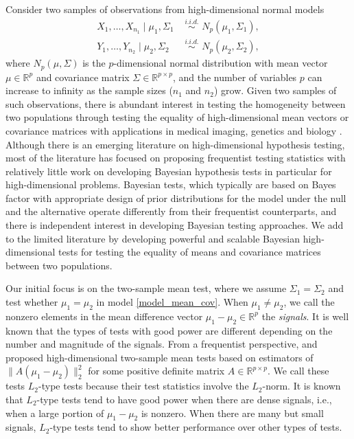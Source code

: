 \documentclass[11pt]{article}
\newcommand{\sg}{\Sigma}
\newcommand{\bbR}{\mathbb{R}}
\begin{document}
Consider two samples of observations from high-dimensional normal models 
\begin{equation}
	\begin{split}\label{model_mean_cov}
		X_1,\ldots, X_{n_1} \mid \mu_1, \sg_1 &\,\,\overset{i.i.d.}{\sim}\,\, N_p(\mu_1, \sg_1) , \\
		Y_1,\ldots, Y_{n_2} \mid \mu_2, \sg_2 &\,\,\overset{i.i.d.}{\sim}\,\, N_p(\mu_2,  \sg_2), 
	\end{split}
\end{equation}
where $N_p(\mu,\sg)$ is the $p$-dimensional normal distribution with mean vector $\mu\in\bbR^p$ and covariance matrix $\sg \in \bbR^{p\times p}$, and the number of variables $p$ can increase to infinity as the sample sizes ($n_1$ and $n_2$) grow.  Given two samples of such observations, there is abundant interest in testing the homogeneity between two populations through testing  the equality of high-dimensional mean vectors or covariance matrices with applications in medical imaging, genetics and biology \citep{tsai2009multivariate,shen2011shrinkage}. Although there is an emerging literature on high-dimensional hypothesis testing, most of the literature has focused on proposing frequentist testing statistics with relatively little work on developing Bayesian hypothesis tests in particular for high-dimensional problems.  Bayesian tests, which typically are based on Bayes factor with appropriate design of prior distributions for the model under the null and the alternative operate differently from their frequentist counterparts, and there is independent interest in developing Bayesian testing approaches.   We add to the limited literature by developing powerful and scalable Bayesian high-dimensional tests for testing the equality of means and covariance matrices between two populations. 



Our initial focus is on the two-sample mean test, where we assume $\sg_1= \sg_2$ and test whether $\mu_1=\mu_2$ in model \eqref{model_mean_cov}.
When $\mu_1 \neq \mu_2$, we call the nonzero elements in the  mean difference vector  $\mu_1-\mu_2 \in \bbR^p$ the {\it signals}.
It is well known that the types of tests with good power are different depending on the number and magnitude of the signals. 
From a frequentist perspective, \cite{bai1996effect} and \cite{srivastava2008test} proposed high-dimensional two-sample mean tests based on estimators of $\| A (\mu_1 - \mu_2)\|_2^2$ for some positive definite matrix $A \in \bbR^{p\times p}$.
We call these tests  $L_2$-type tests because their test statistics involve the $L_2$-norm.
It is known that $L_2$-type tests tend to have good power when there are dense signals, i.e., when  a large portion of $\mu_{1}-\mu_{2}$ is nonzero.
When there are many but small signals, $L_2$-type tests  tend to show better performance over other types of tests.
\end{document}
